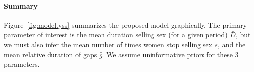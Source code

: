 \paragraph{Summary}
Figure~\ref{fig:model.yss} summarizes the proposed model graphically. %
The primary parameter of interest is
the mean duration selling sex (for a given period) $\bar{D}$,
but we must also infer
the mean number of times women stop selling sex $\bar{s}$, and
the mean relative duration of gaps $\bar{g}$.
We assume uninformative priors for these 3 parameters. %
